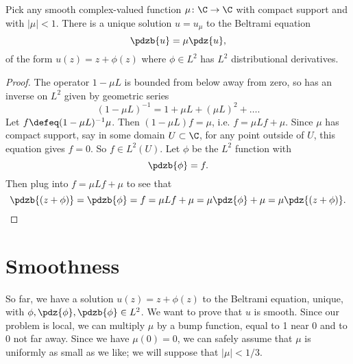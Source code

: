 \begin{theorem}\label{theorem:L2}
Pick any smooth complex-valued function \(\mu \colon \C \to \C\) with compact support and with \(|\mu|<1\).
There is a unique solution \(u=u_{\mu}\) to the Beltrami equation 
\[
\pdzb{u} = \mu \pdz{u},
\]
of the form \(u(z)=z+\phi(z)\) where \(\phi \in L^2\) has \(L^2\) distributional derivatives.
\end{theorem}
\begin{proof}
The operator \(1-\mu L\) is bounded from below away from zero, so has an inverse on \(L^2\) given by geometric series
\[
(1-\mu L)^{-1}
=
1 + \mu L + (\mu L)^2 + \dots.
\]
Let \(f \defeq (1-\mu L)^{-1} \mu\).
Then \((1-\mu L)f = \mu\), i.e. \(f=\mu L f + \mu\).
Since \(\mu\) has compact support, say in some domain \(U \subset \C\), for any point outside of \(U\), this equation gives \(f=0\).
So \(f \in L^2(U)\).
Let \(\phi\) be the \(L^2\) function with 
\[
\pdzb{\phi}=f.
\]
Then plug into \(f=\mu L f + \mu\) to see that
\[
\pdzb{(z+\phi)}=\pdzb{\phi}=f=\mu L f + \mu = \mu \pdz{\phi} + \mu = \mu \pdz{(z+\phi)}.
\]
\end{proof}

\section{Smoothness}
So far, we have a solution \(u(z)=z + \phi(z)\) to the Beltrami equation, unique, with \(\phi,\pdz{\phi},\pdzb{\phi} \in L^2\).
We want to prove that \(u\) is smooth.
Since our problem is local, we can multiply \(\mu\) by a bump function, equal to 1 near 0 and to 0 not far away.
Since we have \(\mu(0)=0\), we can safely assume that \(\mu\) is uniformly as small as we like; we will suppose that \(|\mu|<1/3\).

